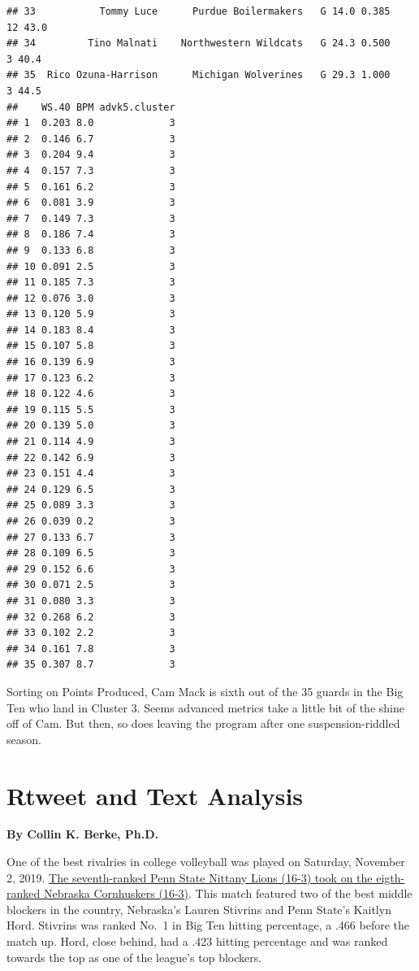 \documentclass[]{book}
\begin{document}
\begin{verbatim}
## 33           Tommy Luce      Purdue Boilermakers   G 14.0 0.385    12 43.0
## 34         Tino Malnati    Northwestern Wildcats   G 24.3 0.500     3 40.4
## 35  Rico Ozuna-Harrison      Michigan Wolverines   G 29.3 1.000     3 44.5
##    WS.40 BPM advk5.cluster
## 1  0.203 8.0             3
## 2  0.146 6.7             3
## 3  0.204 9.4             3
## 4  0.157 7.3             3
## 5  0.161 6.2             3
## 6  0.081 3.9             3
## 7  0.149 7.3             3
## 8  0.186 7.4             3
## 9  0.133 6.8             3
## 10 0.091 2.5             3
## 11 0.185 7.3             3
## 12 0.076 3.0             3
## 13 0.120 5.9             3
## 14 0.183 8.4             3
## 15 0.107 5.8             3
## 16 0.139 6.9             3
## 17 0.123 6.2             3
## 18 0.122 4.6             3
## 19 0.115 5.5             3
## 20 0.139 5.0             3
## 21 0.114 4.9             3
## 22 0.142 6.9             3
## 23 0.151 4.4             3
## 24 0.129 6.5             3
## 25 0.089 3.3             3
## 26 0.039 0.2             3
## 27 0.133 6.7             3
## 28 0.109 6.5             3
## 29 0.152 6.6             3
## 30 0.071 2.5             3
## 31 0.080 3.3             3
## 32 0.268 6.2             3
## 33 0.102 2.2             3
## 34 0.161 7.8             3
## 35 0.307 8.7             3
\end{verbatim}

Sorting on Points Produced, Cam Mack is sixth out of the 35 guards in the Big Ten who land in Cluster 3. Seems advanced metrics take a little bit of the shine off of Cam. But then, so does leaving the program after one suspension-riddled season.

\hypertarget{rtweet-and-text-analysis}{%
\chapter{Rtweet and Text Analysis}\label{rtweet-and-text-analysis}}

\textbf{By Collin K. Berke, Ph.D.}

One of the best rivalries in college volleyball was played on Saturday, November 2, 2019. \href{https://journalstar.com/sports/huskers/volleyball/john-cook-on-the-radio-nebraska-penn-state-match-will/article_c1d5c426-e136-5ef2-b589-510a0f17da82.html}{The seventh-ranked Penn State Nittany Lions (16-3) took on the eigth-ranked Nebraska Cornhuskers (16-3)}. This match featured two of the best middle blockers in the country, Nebraska's Lauren Stivrins and Penn State's Kaitlyn Hord. Stivrins was ranked No.~1 in Big Ten hitting percentage, a .466 before the match up. Hord, close behind, had a .423 hitting percentage and was ranked towards the top as one of the league's top blockers.
\end{document}
